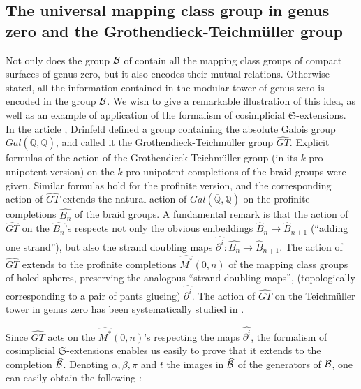 \documentclass[twoside]{irmaems}
\theoremstyle{plain}
\theoremstyle{definition}
\theoremstyle{remark}
\newcommand{\Q}{{\mathbb{Q}}}
\begin{document}
\subsection{The universal mapping class group in genus zero and 
the Grothendieck-Teichm\"uller group}
Not only does the group  ${\cal B}$ of \cite{fu-ka1} contain all the mapping class groups of compact surfaces of genus zero,  but it also encodes their 
mutual relations. 
Otherwise stated, all the information contained in the modular tower of genus zero 
 is encoded in the group ${\cal B}$. 
We wish to give a remarkable illustration of this idea, as well as an example of application of the formalism of cosimplicial ${\mathfrak S}$-extensions.\\


\vspace{0.1cm}\noindent 
In the article \cite{dr}, Drinfeld defined a group 
containing the absolute Galois group $Gal(\overline{\Q},\Q)$, and called it the 
 Grothendieck-Teichm\"uller  group $\widehat{GT}$. 
 Explicit formulas of the action of 
 the Grothendieck-Teichm\"uller group (in its $k$-pro-unipotent version) 
 on the $k$-pro-unipotent completions of the braid groups were given.
 Similar formulas hold for the profinite version, and the corresponding action of $\widehat{GT}$ 
extends the natural action of $Gal(\overline{\Q},\Q)$ on the profinite completions $\widehat{B_{n}}$  
of the braid groups. A fundamental remark is that the action of $\widehat{GT}$ on the
$\widehat{B_{n}}$'s respects not only the obvious embeddings 
$\widehat{B}_{n}\rightarrow \widehat{B}_{n+1}$ (``adding one strand''), but also 
the strand doubling maps $\widehat{\partial^{i}}: \widehat{B_{n}} \rightarrow \widehat{B}_{n+1}$. 
The action of $\widehat{GT}$ extends to the profinite completions 
 $\widehat{M^*}(0,n)$ of the mapping class groups of holed spheres, preserving the analogous ``strand doubling maps'',
 (topologically corresponding to a pair of pants glueing)  $\widehat{\partial^{i}}$. The action of  
 $\widehat{GT}$ on the Teichm\"uller tower in genus zero 
 has been systematically studied in \cite{bu-fe-lo-sc-vo}. 


\vspace{0.1cm}\noindent 
Since $\widehat{GT}$ acts on the $\widehat{M^*}(0,n)$'s respecting 
the maps $\widehat{\partial^{i}}$, the formalism of cosimplicial $\mathfrak S$-extensions 
enables us easily to prove that it extends 
to the completion $\widehat{\cal B}$.  Denoting  $\alpha,\beta, \pi$ and $t$ 
the images in $\widehat{\cal B}$ 
of the generators of ${\cal B}$, one can easily obtain the following :
\end{document}
